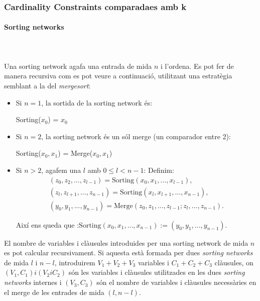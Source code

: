 \documentclass[11pt,a4paper,twoside]{report}
\begin{document}
  \subsubsection{Cardinality Constraints comparadaes amb k}
  \paragraph*{Sorting networks}~\\~\\
  Una sorting network agafa una entrada de mida $n$ i l'ordena. Es pot fer de manera recursiva com es pot veure a continuació, utilitzant una estratègia semblant a la del \textit{mergesort}:
  
  \begin{itemize}
    \item Si $n = 1$, la sortida de la sorting network és:\\ \begin{center} Sorting($x_0$) = $x_0$\end{center}
    \item Si $n = 2$, la sorting network és un sól merge (un comparador entre 2):\\ \begin{center} Sorting($x_0, x_1$) = Merge($x_0, x_1$)\end{center}
    \item Si $n > 2$, agafem una $l$ amb $0 \leq l < n-1$: Definim:
    \begin{gather*}
      (z_0,z_2, . . . ,z_{l-1}) = \text{Sorting}(x_0, x_1, . . . , x_{l-1}),\\
      (z_l,z_{l+1}, . . . ,z_{n-1}) = \text{Sorting}(x_l, x_{l+1}, . . . , x_{n-1}), \\
      (y_0, y_1, . . . , y_{n-1}) = \text{Merge}(z_0,z_1, . . . , z_{l-1};z_l, . . . ,z_{n-1}).
    \end{gather*}

    Així ens queda que :$\text{Sorting}(x_0, x_1, . . . , x_{n-1}) := (y_0, y_1, . . . , y_{n-1}).$
  \end{itemize}

  El nombre de variables i clàusules introduides per una sorting network de mida $n$ es pot calcular recursivament. Si aquesta està formada per dues \textit{sorting networks} de mida $l$ i $n-l$, introduirem $V_1 + V_2 + V_3$ variables i $C_1 + C_2 + C_3$ clàusules, on $(V_1, C_1) i (V_2 i C_2)$ són les variables i clàusules utilitzades en les dues \textit{sorting networks} internes i $(V_3, C_3)$ són el nombre de variables i clàusules necessàries en el merge de les entrades de mida $(l, n-l)$.
\end{document}
